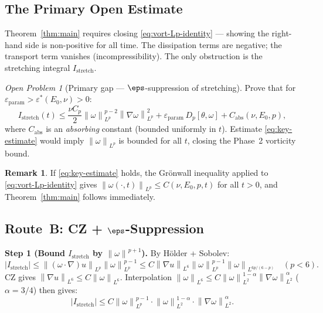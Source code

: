 \documentclass[11pt]{article}
\theoremstyle{definition}
\newtheorem{remark}[theorem]{Remark}
\theoremstyle{remark}
\newtheorem{openproblem}[theorem]{Open Problem}
\newcommand{\norm}[1]{\left\|#1\right\|}
\newcommand{\abs}[1]{\left|#1\right|}
\newcommand{\grad}{\nabla}
\newcommand{\epsst}{\varepsilon^*}
\newcommand{\epsp}{\varepsilon_{\mathrm{param}}}
\begin{document}
\subsection{The Primary Open Estimate}
\label{sec:open-estimate}

Theorem~\ref{thm:main} requires closing \eqref{eq:vort-Lp-identity} —
showing the right-hand side is non-positive for all time.  The dissipation
terms are negative; the transport term vanishes (incompressibility).
The only obstruction is the stretching integral $I_{\mathrm{stretch}}$.

\begin{openproblem}[Primary gap — $\eps$-suppression of stretching]\label{op:main}
  Prove that for $\epsp>\epsst(E_0,\nu)>0$:
  \begin{equation}\label{eq:key-estimate}
    I_{\mathrm{stretch}}(t)
    \leq \frac{\nu C_p}{2}\norm{\omega}^{p-2}_{L^p}\norm{\grad\omega}^2_{L^p}
      + \epsp\,D_p[\theta,\omega] + C_{\mathrm{abs}}(\nu,E_0,p),
  \end{equation}
  where $C_{\mathrm{abs}}$ is an \emph{absorbing} constant (bounded uniformly in $t$).
  Estimate \eqref{eq:key-estimate} would imply $\norm{\omega}_{L^p}$ is bounded
  for all $t$, closing the Phase~2 vorticity bound.
\end{openproblem}

\begin{remark}
  If \eqref{eq:key-estimate} holds, the Gr\"onwall inequality applied to
  \eqref{eq:vort-Lp-identity} gives
  $\norm{\omega(\cdot,t)}_{L^p}\leq C(\nu,E_0,p,t)$ for all $t>0$,
  and Theorem~\ref{thm:main} follows immediately.
\end{remark}

\subsection{Route~B: CZ + $\eps$-Suppression}
\label{sec:routeB}

\textbf{Step 1 (Bound $I_{\mathrm{stretch}}$ by $\norm{\omega}^{p+1}$).}
By H\"older + Sobolev:
\begin{equation}\label{eq:stretch-Lp}
  \abs{I_{\mathrm{stretch}}} \leq \norm{(\omega\cdot\grad)u}_{L^p}\norm{\omega}^{p-1}_{L^p}
  \leq C\norm{\grad u}_{L^6}\norm{\omega}^{p-1}_{L^p}\norm{\omega}_{L^{6p/(6-p)}}
  \quad (p<6).
\end{equation}
CZ gives $\norm{\grad u}_{L^6}\leq C\norm{\omega}_{L^6}$.
Interpolation $\norm{\omega}_{L^6}\leq C\norm{\omega}^{1-\alpha}_{L^2}\norm{\grad\omega}^\alpha_{L^2}$
($\alpha=3/4$) then gives:
\begin{equation}
  \abs{I_{\mathrm{stretch}}}
  \leq C\norm{\omega}^{p-1}_{L^p}\cdot\norm{\omega}^{1-\alpha}_{L^2}
    \cdot\norm{\grad\omega}^\alpha_{L^2}.
\end{equation}
\end{document}
